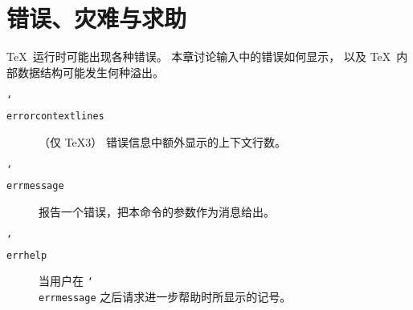 \documentclass[a4paper]{rapport3}
\def\nl{\protect\\}\def\n#1{{\tt #1}}\def\cs#1{{\tt\char`\\#1}}\let\csc\cs
\newenvironment{inventory}{\begin{description}}{\end{description}}
\begin{document}



\endofchapter
\chapter{错误、灾难与求助}\label{error}

\TeX\ 运行时可能出现各种错误。
本章讨论输入中的错误如何显示，
以及 \TeX\ 内部数据结构可能发生何种溢出。

\begin{inventory}
\item [\cs{errorcontextlines}] 
      （仅 \TeX3）
      错误信息中额外显示的上下文行数。

\item [\cs{errmessage}] 
      报告一个错误，把本命令的参数作为消息给出。

\item [\cs{errhelp}] 
      当用户在 \cs{errmessage} 之后请求进一步帮助时所显示的记号。

\end{inventory}
\end{document}
